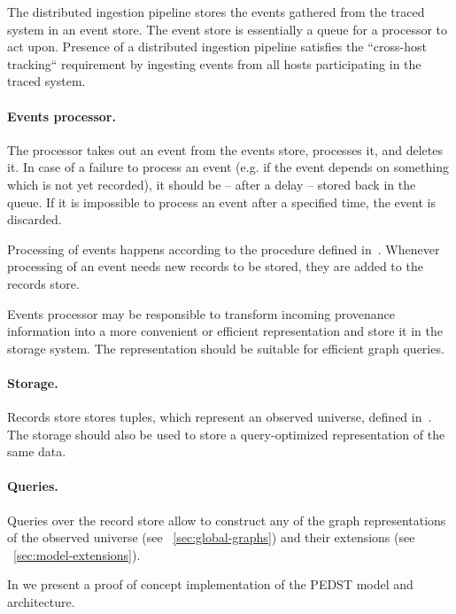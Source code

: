 The distributed ingestion pipeline stores the events gathered from the traced system in an event store. The event store is essentially a queue for a processor to act upon. Presence of a distributed ingestion pipeline satisfies the ``cross-host tracking`` requirement by ingesting events from all hosts participating in the traced system.

\paragraph*{Events processor.}

The processor takes out an event from the events store, processes it, and deletes it. In case of a failure to process an event (e.g. if the event depends on something which is not yet recorded), it should be -- after a delay -- stored back in the queue. If it is impossible to process an event after a specified time, the event is discarded.

Processing of events happens according to the procedure defined in~. Whenever processing of an event needs new records to be stored, they are added to the records store.

Events processor may be responsible to transform incoming provenance information into a more convenient or efficient representation and store it in the storage system. The representation should be suitable for efficient graph queries.


\paragraph*{Storage.}

Records store stores tuples, which represent an observed universe, defined in~. The storage should also be used to store a query-optimized representation of the same data.

\paragraph*{Queries.}

Queries over the record store allow to construct any of the graph representations of the observed universe (see ~\cref{sec:global-graphs}) and their extensions (see ~\cref{sec:model-extensions}).

\bigskip

In  we present a proof of concept implementation of the PEDST model and architecture.